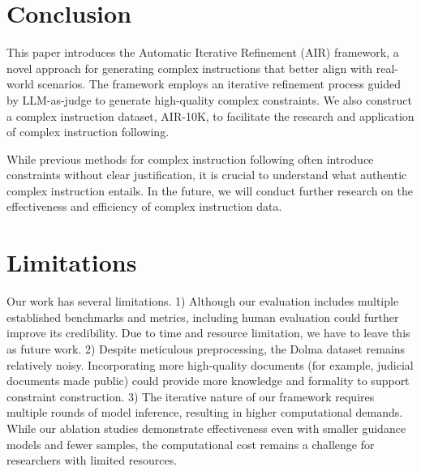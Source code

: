 \section{Conclusion}
This paper introduces the Automatic Iterative Refinement (AIR) framework, a novel approach for generating complex instructions that better align with real-world scenarios. The framework employs an iterative refinement process guided by LLM-as-judge to generate high-quality complex constraints. We also construct a complex instruction dataset, AIR-10K, to facilitate the research and application of complex instruction following.

While previous methods for complex instruction following often introduce constraints without clear justification, it is crucial to understand what authentic complex instruction entails. In the future, we will conduct further research on the effectiveness and efficiency of complex instruction data.



\section*{Limitations}

Our work has several limitations. 1) Although our evaluation includes multiple established benchmarks and metrics, including human evaluation could further improve its credibility. Due to time and resource limitation, we have to leave this as future work. 2) Despite meticulous preprocessing, the Dolma dataset remains relatively noisy. Incorporating more high-quality documents (for example, judicial documents made public) could provide more knowledge and formality to support constraint construction. 3) The iterative nature of our framework requires multiple rounds of model inference, resulting in higher computational demands. While our ablation studies demonstrate effectiveness even with smaller guidance models and fewer samples, the computational cost remains a challenge for researchers with limited resources.

